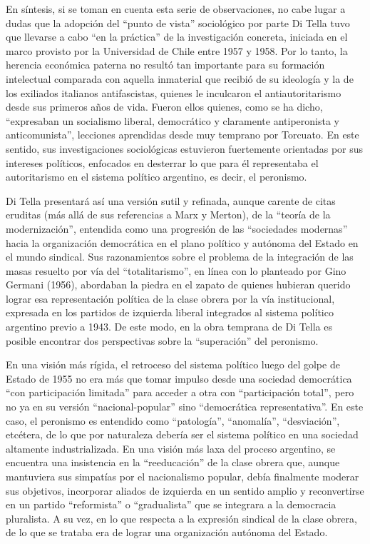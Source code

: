 En síntesis, si se toman en cuenta esta serie de observaciones, no cabe lugar a dudas que la adopción del ``punto de vista'' sociológico por parte Di Tella tuvo que llevarse a cabo ``en la práctica'' de la investigación concreta, iniciada en el marco provisto por la Universidad de Chile entre 1957 y 1958. Por lo tanto, la herencia económica paterna no resultó tan importante para su formación intelectual comparada con aquella inmaterial que recibió de su ideología y la de los exiliados italianos antifascistas, quienes le inculcaron el antiautoritarismo desde sus primeros años de vida. Fueron ellos quienes, como se ha dicho, ``expresaban un socialismo liberal, democrático y claramente antiperonista y anticomunista'', lecciones aprendidas desde muy temprano por Torcuato. En este sentido, sus investigaciones sociológicas estuvieron fuertemente orientadas por sus intereses políticos, enfocados en desterrar lo que para él representaba el autoritarismo en el sistema político argentino, es decir, el peronismo.

Di Tella presentará así una versión sutil y refinada, aunque carente de citas eruditas (más allá de sus referencias a Marx y Merton), de la ``teoría de la modernización'', entendida como una progresión de las ``sociedades modernas'' hacia la organización democrática en el plano político y autónoma del Estado en el mundo sindical. Sus razonamientos sobre el problema de la integración de las masas resuelto por vía del ``totalitarismo'', en línea con lo planteado por Gino Germani (1956), abordaban la piedra en el zapato de quienes hubieran querido lograr esa representación política de la clase obrera por la vía institucional, expresada en los partidos de izquierda liberal integrados al sistema político argentino previo a 1943. De este modo, en la obra temprana de Di Tella es posible encontrar dos perspectivas sobre la ``superación'' del peronismo.

En una visión más rígida, el retroceso del sistema político luego del golpe de Estado de 1955 no era más que tomar impulso desde una sociedad democrática ``con participación limitada'' para acceder a otra con ``participación total'', pero no ya en su versión ``nacional-popular'' sino ``democrática representativa''. En este caso, el peronismo es entendido como ``patología'', ``anomalía'', ``desviación'', etcétera, de lo que por naturaleza debería ser el sistema político en una sociedad altamente industrializada. En una visión más laxa del proceso argentino, se encuentra una insistencia en la ``reeducación'' de la clase obrera que, aunque mantuviera sus simpatías por el nacionalismo popular, debía finalmente moderar sus objetivos, incorporar aliados de izquierda en un sentido amplio y reconvertirse en un partido ``reformista'' o ``gradualista'' que se integrara a la democracia pluralista. A su vez, en lo que respecta a la expresión sindical de la clase obrera, de lo que se trataba era de lograr una organización autónoma del Estado.

